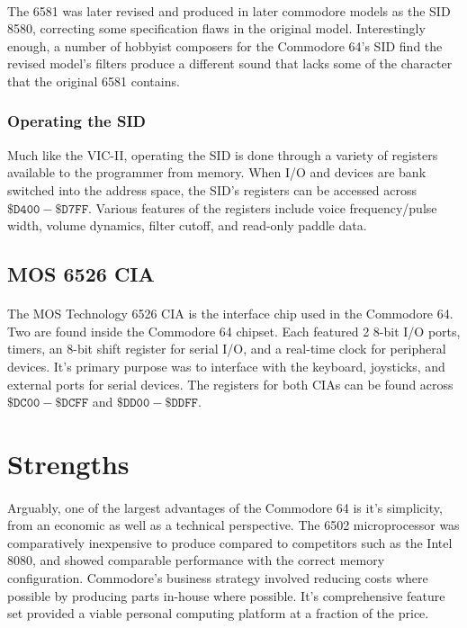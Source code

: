 \documentclass{article}
\begin{document}
\paragraph{}
The 6581 was later revised and produced in later commodore models as the SID 8580, correcting some specification flaws in the original model. Interestingly enough, a number of hobbyist composers for the Commodore 64's SID find the revised model's filters produce a different sound that lacks some of the character that the original 6581 contains.

\subsubsection{Operating the SID}
Much like the VIC-II, operating the SID is done through a variety of registers available to the programmer from memory. When I/O and devices are bank switched into the address space, the SID's registers can be accessed across $\mathtt{\$D400 - \$D7FF}$. Various features of the registers include voice frequency/pulse width, volume dynamics, filter cutoff, and read-only paddle data.

\subsection{MOS 6526 CIA}
\paragraph{}
The MOS Technology 6526 CIA is the interface chip used in the Commodore 64. Two are found inside the Commodore 64 chipset. Each featured 2 8-bit I/O ports, timers, an 8-bit shift register for serial I/O, and a real-time clock for peripheral devices. It's primary purpose was to interface with the keyboard, joysticks, and external ports for serial devices. The registers for both CIAs can be found across $\mathtt{\$DC00 - \$DCFF}$ and $\mathtt{\$DD00 - \$DDFF}$.

\section{Strengths}
\paragraph{}
Arguably, one of the largest advantages of the Commodore 64 is it's simplicity, from an economic as well as a technical perspective. The 6502 microprocessor was comparatively inexpensive to produce compared to competitors such as the Intel 8080, and showed comparable performance with the correct memory configuration. Commodore's business strategy involved reducing costs where possible by producing parts in-house where possible. It's comprehensive feature set provided a viable personal computing platform at a fraction of the price.
\end{document}
